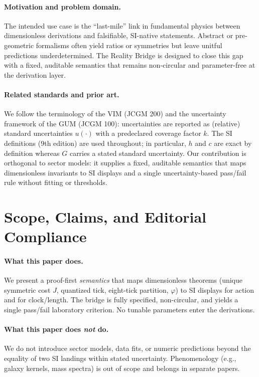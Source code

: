 \documentclass[11pt]{article}
\begin{document}
\paragraph{Motivation and problem domain.}
The intended use case is the “last-mile” link in fundamental physics between dimensionless derivations and falsifiable, SI-native statements. Abstract or pre-geometric formalisms often yield ratios or symmetries but leave unitful predictions underdetermined. The Reality Bridge is designed to close this gap with a fixed, auditable semantics that remains non-circular and parameter-free at the derivation layer.

\paragraph{Related standards and prior art.}
We follow the terminology of the VIM (JCGM 200) and the uncertainty framework of the GUM (JCGM 100): uncertainties are reported as (relative) standard uncertainties \(u(\cdot)\) with a predeclared coverage factor \(k\). The SI definitions (9th edition) are used throughout; in particular, \(h\) and \(c\) are exact by definition whereas \(G\) carries a stated standard uncertainty. Our contribution is orthogonal to sector models: it supplies a fixed, auditable semantics that maps dimensionless invariants to SI displays and a single uncertainty-based pass/fail rule without fitting or thresholds.

\section{Scope, Claims, and Editorial Compliance}

\paragraph{What this paper does.}
We present a proof-first \emph{semantics} that maps dimensionless theorems (unique symmetric cost \(J\), quantized tick, eight-tick partition, \(\varphi\)) to SI displays for action and for clock/length. The bridge is fully specified, non-circular, and yields a single pass/fail laboratory criterion. No tunable parameters enter the derivations.

\paragraph{What this paper does \emph{not} do.}
We do not introduce sector models, data fits, or numeric predictions beyond the equality of two SI landings within stated uncertainty. Phenomenology (e.g., galaxy kernels, mass spectra) is out of scope and belongs in separate papers.
\end{document}
